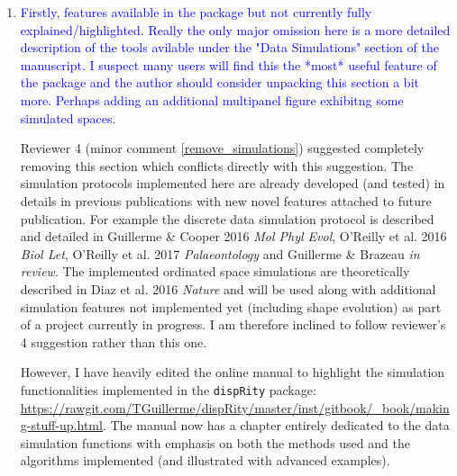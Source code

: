 \documentclass[12pt,letterpaper]{article}
\begin{document}
\begin{enumerate}
\item{\textcolor{blue}{Firstly, features available in the package but not currently fully explained/highlighted.
Really the only major omission here is a more detailed description of the tools avilable under the "Data Simulations" section of the manuscript.
I suspect many users will find this the *most* useful feature of the package and the author should consider unpacking this section a bit more.
Perhaps adding an additional multipanel figure exhibitng some simulated spaces.}}
\label{simulations}

Reviewer 4 (minor comment \ref{remove_simulations}) suggested completely removing this section which conflicts directly with this suggestion.
The simulation protocols implemented here are already developed (and tested) in details in previous publications with new novel features attached to future publication.
For example the discrete data simulation protocol is described and detailed in Guillerme \& Cooper 2016 \textit{Mol Phyl Evol}, O’Reilly et al. 2016 \textit{Biol Let}, O'Reilly et al. 2017 \textit{Palaeontology} and Guillerme \& Brazeau \textit{in review}.
The implemented ordinated space simulations are theoretically described in Diaz et al. 2016 \textit{Nature} and will be used along with additional simulation features not implemented yet (including shape evolution) as part of a project currently in progress.
I am therefore inclined to follow reviewer's 4 suggestion rather than this one.

However, I have heavily edited the online manual to highlight the simulation functionalities implemented in the \texttt{dispRity} package: \url{https://rawgit.com/TGuillerme/dispRity/master/inst/gitbook/_book/making-stuff-up.html}.
The manual now has a chapter entirely dedicated to the data simulation functions with emphasis on both the methods used and the algorithms implemented (and illustrated with advanced examples).


\end{enumerate}
\end{document}
